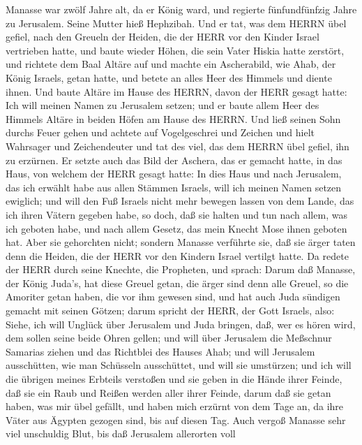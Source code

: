  Manasse war zwölf Jahre alt, da er König ward, und regierte
fünfundfünfzig Jahre zu Jerusalem. Seine Mutter hieß Hephzibah.
 Und er tat, was dem HERRN übel gefiel, nach den Greueln der
Heiden, die der HERR vor den Kinder Israel vertrieben hatte,
 und baute wieder Höhen, die sein Vater Hiskia hatte
zerstört, und richtete dem Baal Altäre auf und machte ein Ascherabild,
wie Ahab, der König Israels, getan hatte, und betete an alles Heer des
Himmels und diente ihnen.  Und baute Altäre im Hause des
HERRN, davon der HERR gesagt hatte: Ich will meinen Namen zu Jerusalem
setzen;  und er baute allem Heer des Himmels Altäre in
beiden Höfen am Hause des HERRN.  Und ließ seinen Sohn
durchs Feuer gehen und achtete auf Vogelgeschrei und Zeichen und hielt
Wahrsager und Zeichendeuter und tat des viel, das dem HERRN übel gefiel,
ihn zu erzürnen.  Er setzte auch das Bild der Aschera, das
er gemacht hatte, in das Haus, von welchem der HERR gesagt hatte: In
dies Haus und nach Jerusalem, das ich erwählt habe aus allen Stämmen
Israels, will ich meinen Namen setzen ewiglich;  und will
den Fuß Israels nicht mehr bewegen lassen von dem Lande, das ich ihren
Vätern gegeben habe, so doch, daß sie halten und tun nach allem, was ich
geboten habe, und nach allem Gesetz, das mein Knecht Mose ihnen geboten
hat.  Aber sie gehorchten nicht; sondern Manasse verführte
sie, daß sie ärger taten denn die Heiden, die der HERR vor den Kindern
Israel vertilgt hatte.  Da redete der HERR durch seine
Knechte, die Propheten, und sprach:  Darum daß Manasse, der
König Juda's, hat diese Greuel getan, die ärger sind denn alle Greuel,
so die Amoriter getan haben, die vor ihm gewesen sind, und hat auch Juda
sündigen gemacht mit seinen Götzen;  darum spricht der
HERR, der Gott Israels, also: Siehe, ich will Unglück über Jerusalem und
Juda bringen, daß, wer es hören wird, dem sollen seine beide Ohren
gellen;  und will über Jerusalem die Meßschnur Samarias
ziehen und das Richtblei des Hauses Ahab; und will Jerusalem
ausschütten, wie man Schüsseln ausschüttet, und will sie umstürzen;
 und ich will die übrigen meines Erbteils verstoßen und sie
geben in die Hände ihrer Feinde, daß sie ein Raub und Reißen werden
aller ihrer Feinde,  darum daß sie getan haben, was mir
übel gefällt, und haben mich erzürnt von dem Tage an, da ihre Väter aus
Ägypten gezogen sind, bis auf diesen Tag.  Auch vergoß
Manasse sehr viel unschuldig Blut, bis daß Jerusalem allerorten voll
